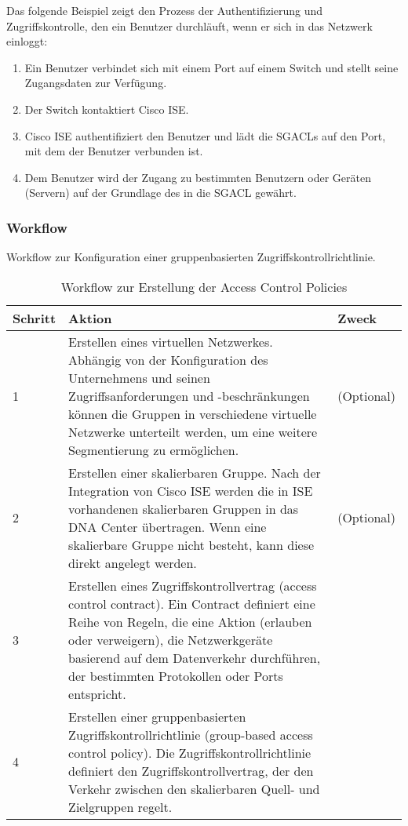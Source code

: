 Das folgende Beispiel zeigt den Prozess der Authentifizierung und Zugriffskontrolle, den ein Benutzer durchläuft, wenn er sich in das Netzwerk einloggt:
\begin{enumerate}
	\item Ein Benutzer verbindet sich mit einem Port auf einem Switch und stellt seine Zugangsdaten zur Verfügung.
	\item Der Switch kontaktiert Cisco ISE.
	\item Cisco ISE authentifiziert den Benutzer und lädt die SGACLs auf den Port, mit dem der Benutzer verbunden ist.
	\item  Dem Benutzer wird der Zugang zu bestimmten Benutzern oder Geräten (Servern) auf der Grundlage des in die SGACL gewährt.
\end{enumerate}

\subsubsection{Workflow}
Workflow zur Konfiguration einer gruppenbasierten Zugriffskontrollrichtlinie.

\begin{table}[H]
	\centering
	\begin{tabularx}{\textwidth}{p{2 cm} | X | p{2 cm}}
		\rowcolor{gray!50}
		\textbf{Schritt} & \textbf{Aktion} & \textbf{Zweck} \\
		\hline	
		1 & Erstellen eines virtuellen Netzwerkes. Abhängig von der Konfiguration des Unternehmens und seinen Zugriffsanforderungen und -beschränkungen können die Gruppen in verschiedene virtuelle Netzwerke unterteilt werden, um eine weitere Segmentierung zu ermöglichen. & (Optional) \\
		2 & Erstellen einer skalierbaren Gruppe. Nach der Integration von Cisco ISE werden die in ISE vorhandenen skalierbaren Gruppen in das DNA Center übertragen. Wenn eine skalierbare Gruppe nicht besteht, kann diese direkt angelegt werden. & (Optional) \\
		3 & Erstellen eines Zugriffskontrollvertrag (access control contract). Ein Contract definiert eine Reihe von Regeln, die eine Aktion (erlauben oder verweigern), die Netzwerkgeräte basierend auf dem Datenverkehr durchführen, der bestimmten Protokollen oder Ports entspricht. & \\
		4 & Erstellen einer gruppenbasierten Zugriffskontrollrichtlinie (group-based access control policy). Die Zugriffskontrollrichtlinie definiert den Zugriffskontrollvertrag, der den Verkehr zwischen den skalierbaren Quell- und Zielgruppen regelt. & \\
		
	\end{tabularx}
	\caption{Workflow zur Erstellung der Access Control Policies}
	\label{tab:Workflow zur Erstellung der Access Control Policies}
\end{table}

